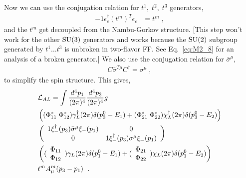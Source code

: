 \documentclass[10pt, aps, prd, superscriptaddress, nofootinbib, 
               amsmath, amssymb, twocolumn,
               preprintnumbers, showpacs,
               raggedbottom,
               floatfix]{revtex4-1}
\newcommand{\calL}{{\cal{L}}}
\newcommand{\bsigma}{{\bar{\sigma}}}
\newcommand{\SU}{{\rm{SU}}}
\begin{document}
Now we can use the conjugation relation for $t^1,\;t^2,\;t^3$ generators,
\begin{equation}
\begin{split}
-1\epsilon_{c}^\dagger(t^m)^T \epsilon_c&=t^m\;,
\end{split}
\end{equation}
and the $t^m$ get decoupled from the Nambu-Gorkov structure. [This step won't
work for the other $\SU(3)$ generators and works because the $\SU(2)$ subgroup 
generated by $t^1\dots t^3$ is unbroken in two-flavor FF. See Eq.~\ref{eq:M2_8} for
an analysis of a broken generator.] We also use the conjugation relation for 
$\bsigma^\mu$,
\begin{equation}
\begin{split}
C \bsigma^{T\mu} C^\dagger = \sigma^{\mu}\;, 
\end{split}
\end{equation}
to simplify the spin structure. This gives,
\begin{equation}
\begin{split}
&\calL_{AL}=\int \frac{d^4p_1}{(2\pi)^4} \frac{d^4p_3}{(2\pi)^4} {g}\\
&
\left(
  (\Phi^*_{11}\;\Phi^*_{12})\gamma_L^\dagger(2\pi)\delta(p_3^0-E_1)+
  (\Phi^*_{21}\;\Phi^*_{22})\chi_L^\dagger(2\pi)\delta(p_3^0-E_2)\right)  \\
  &
   \left(\begin{array}{cc}
   1\xi_{-}^\dagger(p_3)\bsigma^\mu \xi_{-}(p_1) & 0\\
   0 & 1\xi_{-}^\dagger(p_3)\sigma^{\mu} \xi_{-}(p_1)\\
  \end{array}
  \right)\\
&\left((\begin{array}{c}\Phi_{11}\\ \Phi_{12}\end{array})\gamma_L(2\pi)\delta(p_1^0-E_1)
      +(\begin{array}{c}\Phi_{21}\\ \Phi_{22}\end{array})\chi_L(2\pi)\delta(p_1^0-E_2)
      \right)\\
&      
t^m A^m_{\mu}(p_3-p_1)~\label{eq:LALsimplified}\;.
\end{split}
\end{equation}
\end{document}
